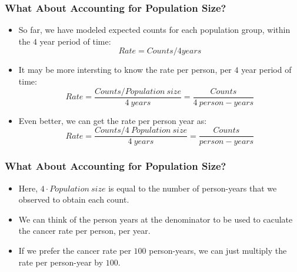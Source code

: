 \documentclass[10pt,xcolor={svgnames},t]{beamer}
\begin{document}
%
%
\begin{frame}
	\frametitle{What About Accounting for Population Size?}
	
	\begin{itemize}
		\item So far, we have modeled expected counts for each population group, within the $4$ year period of time:
		\[ Rate=Counts/4years
		\]
		\item It may be more intersting to know the rate per person, per $4$ year period of time:
		\[ Rate=\frac{Counts/Population\ size}{4\ years} = \frac{Counts}{4\ person-years}
		\]
		\item Even better, we can get the rate per person year as:
		\[ Rate=\frac{Counts/4\ Population\ size}{4\ years} = \frac{Counts}{person-years}
		\]
	\end{itemize}
	
	
\end{frame}
%

\begin{frame}
	\frametitle{What About Accounting for Population Size?}
	
	\begin{itemize}
		\item Here, $4\cdot Population\ size$ is equal to the number of person-years that we observed to obtain each count.
		\bigskip
		\item We can think of the person years at the denominator to be used to caculate the cancer rate per person, per year.
		\bigskip
		\item If we prefer the cancer rate per $100$ person-years, we can just multiply the rate per person-year by $100$.
	\end{itemize}
	
	
\end{frame}
%
\end{document}

